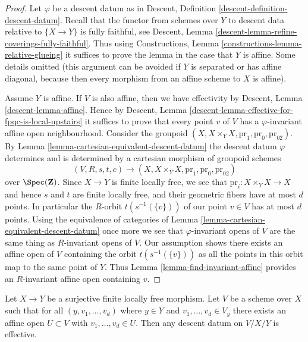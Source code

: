 \begin{proof}
Let $\varphi$ be a descent datum as in
Descent, Definition \ref{descent-definition-descent-datum}.
Recall that the functor from schemes over $Y$ to descent data
relative to $\{X \to Y\}$ is fully faithful, see
Descent, Lemma \ref{descent-lemma-refine-coverings-fully-faithful}.
Thus using Constructions, Lemma \ref{constructions-lemma-relative-glueing}
it suffices to prove the lemma in the case that $Y$ is affine.
Some details omitted (this argument can be avoided if $Y$ is
separated or has affine diagonal, because then every morphism from
an affine scheme to $X$ is affine).

\medskip\noindent
Assume $Y$ is affine. If $V$ is also affine, then we have effectivity by
Descent, Lemma \ref{descent-lemma-affine}. Hence by
Descent, Lemma \ref{descent-lemma-effective-for-fpqc-is-local-upstairs}
it suffices to prove that every point $v$ of $V$ has a $\varphi$-invariant
affine open neighbourhood. Consider the groupoid
$(X, X \times_Y X, \text{pr}_1, \text{pr}_0, \text{pr}_{02})$.
By Lemma \ref{lemma-cartesian-equivalent-descent-datum}
the descent datum $\varphi$ determines and is determined by
a cartesian morphism of groupoid schemes
$$
(V, R, s, t, c)
\longrightarrow
(X, X \times_Y X, \text{pr}_1, \text{pr}_0, \text{pr}_{02})
$$
over $\Spec(\mathbf{Z})$.
Since $X \to Y$ is finite locally free, we see that
$\text{pr}_i : X \times_Y X \to X$ and hence $s$ and $t$
are finite locally free, and their geometric fibers have at most $d$
points. In particular the $R$-orbit $t(s^{-1}(\{v\}))$ of our point
$v \in V$ has at most $d$ points. Using the equivalence of categories of
Lemma \ref{lemma-cartesian-equivalent-descent-datum}
once more we see that $\varphi$-invariant opens of $V$
are the same thing as $R$-invariant opens of $V$.
Our assumption shows there exists an affine open of $V$
containing the orbit $t(s^{-1}(\{v\}))$ as all the points
in this orbit map to the same point of $Y$.
Thus Lemma \ref{lemma-find-invariant-affine}
provides an $R$-invariant affine open containing $v$.
\end{proof}

\begin{lemma}
\label{lemma-descend-along-finite}
Let $X \to Y$ be a surjective finite locally free morphism. 
Let $V$ be a scheme over $X$ such that for all 
$(y, v_1, \ldots, v_d)$ where $y \in Y$ and
$v_1, \ldots, v_d \in V_y$ there exists an affine open
$U \subset V$ with $v_1, \ldots, v_d \in U$.
Then any descent datum on $V/X/Y$ is effective.
\end{lemma}

